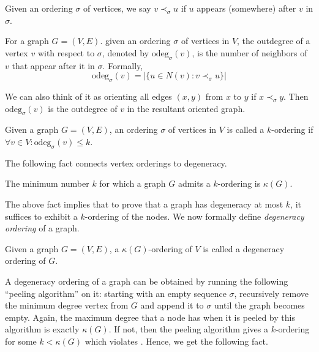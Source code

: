 \documentclass[11pt,letterpaper]{article}
\renewcommand{\leq}{\leqslant}
\theoremstyle{definition}
\newcommand{\odeg}{\text{odeg}}
\begin{document}
Given an ordering $\sigma$ of vertices, we say $v\prec_\sigma u$ if $u$ appears (somewhere) after $v$ in $\sigma$. 

\begin{definition}\label{def:odegordering}
    For a graph $G=(V,E)$. given an ordering $\sigma$ of vertices in $V$, the outdegree of a vertex $v$ with respect to $\sigma$, denoted by $\odeg_{\sigma}(v)$, is the number of neighbors of $v$ that appear after it in $\sigma$. Formally,
$$\odeg_{\sigma}(v) = |\{u\in N(v): v \prec_\sigma u\}|$$ 
\end{definition}

We can also think of it as orienting all edges $(x,y)$ from $x$ to $y$ if $x\prec_\sigma y$. Then $\odeg_\sigma(v)$ is the outdegree of $v$ in the resultant oriented graph. 


\begin{definition}[$k$-ordering]\label{def:k-ordering} 
    Given a graph $G=(V,E)$, an ordering $\sigma$ of vertices in $V$ is called a $k$-ordering if $\forall v\in V: \odeg_\sigma(v)\leq k$.   
\end{definition}

The following fact connects vertex orderings to degeneracy. 

\begin{fact}\label{fact:min-k-ord}
    The minimum number $k$ for which a graph $G$ admits a $k$-ordering is $\kappa(G)$.
\end{fact}


The above fact implies that to prove that a graph has degeneracy at most $k$, it suffices to exhibit a $k$-ordering of the nodes. We now formally define \emph{degeneracy ordering} of a graph.  

\begin{definition} \label{def:degen-ord}
    Given a graph $G=(V,E)$, a $\kappa(G)$-ordering of $V$ is called a degeneracy ordering of $G$.
\end{definition}

A degeneracy ordering of a graph can be obtained by running the following ``peeling algorithm'' on it: starting with an empty sequence $\sigma$, recursively remove the minimum degree vertex from $G$ and append it to $\sigma$ until the graph becomes empty. Again, the maximum degree that a node has when it is peeled by this algorithm is exactly $\kappa(G)$. If not, then the peeling algorithm gives a $k$-ordering for some $k<\kappa(G)$ which violates . Hence, we get the following fact. 
\end{document}
